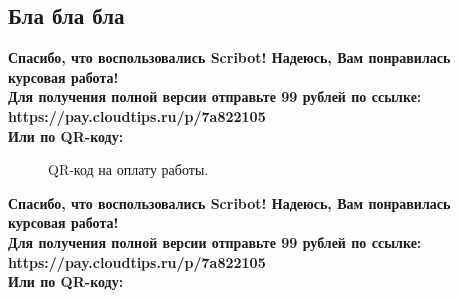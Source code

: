 \documentclass{article}
\begin{document}
\begin{center}
\section{Бла бла бла}
\begin{center}
    \textbf{
        Спасибо, что воспользовались Scribot! Надеюсь, Вам понравилась курсовая работа!\\
        Для получения полной версии отправьте 99 рублей по ссылке:\\
        https://pay.cloudtips.ru/p/7a822105\\
        Или по QR-коду:\\
    }
\end{center}
\begin{figure}[h]
    \caption{QR-код на оплату работы.}
    \label{ris:image}
\end{figure}
\newpage
\begin{center}
    \textbf{
        Спасибо, что воспользовались Scribot! Надеюсь, Вам понравилась курсовая работа!\\
        Для получения полной версии отправьте 99 рублей по ссылке:\\
        https://pay.cloudtips.ru/p/7a822105\\
        Или по QR-коду:\\
}
\end{center}
\end{center}
\end{document}
